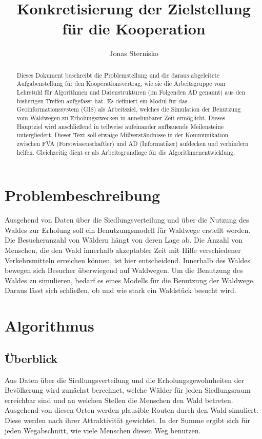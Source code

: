 \documentclass[parskip=half,german]{scrartcl}
\title{Konkretisierung der Zielstellung für die Kooperation}
\subtitle{}
\author{Jonas Sternisko}
\begin{document}
  \maketitle

  \begin{abstract}
Dieses Dokument beschreibt die Problemstellung und die daraus abgeleitete
Aufgabenstellung für den Kooperationsvertrag, wie sie die Arbeitsgruppe vom
Lehrstuhl für Algorithmen und Datenstrukturen (im Folgenden AD genannt) aus den
bisherigen Treffen aufgefasst hat. Es definiert ein Modul für das
Geoinformationssystem (GIS) als Arbeitsziel, welches die Simulation der
Benutzung vom Waldwegen zu Erholungszwecken in annehmbarer Zeit ermöglicht.
Dieses Hauptziel wird anschließend in teilweise aufeinander aufbauende
Meilensteine untergliedert.
Dieser Text soll etwaige Mißverständnisse in der Kommunikation zwischen FVA
(Forstwissenschaftler) und AD (Informatiker) aufdecken und verhindern helfen.
Gleichzeitig dient er als Arbeitsgrundlage für die Algorithmenentwicklung.
  \end{abstract}

  
\section{Problembeschreibung}
Ausgehend von Daten über die Siedlungsverteilung und über die Nutzung des Waldes
zur Erholung soll ein Benutzungsmodell für Waldwege erstellt werden.
Die Besucheranzahl von Wäldern hängt von deren Lage ab. Die Anzahl von Menschen,
die den Wald innerhalb akzeptabler Zeit mit Hilfe verschiedener Verkehrsmitteln
erreichen können, ist hier entscheidend.
Innerhalb des Waldes bewegen sich Besucher überwiegend auf Waldwegen. Um die
Benutzung des Waldes zu simulieren, bedarf es eines Modells für die Benutzung
der Waldwege. Daraus lässt sich schließen, ob und wie stark ein Waldstück
besucht wird.

  
\section{Algorithmus}
\subsection{Überblick}
Aus Daten über die Siedlungsverteilung und die Erholungsgewohnheiten der
Bevölkerung wird zunächst berechnet, welche Wälder für jeden Siedlungsraum
erreichbar sind und an welchen Stellen die Menschen den Wald betreten.
Ausgehend von diesen Orten werden plausible Routen durch den Wald simuliert.
Diese werden nach ihrer Attraktivität gewichtet. In der Summe ergibt sich für
jeden Wegabschnitt, wie viele Menschen diesen Weg benutzen.
\end{document}
